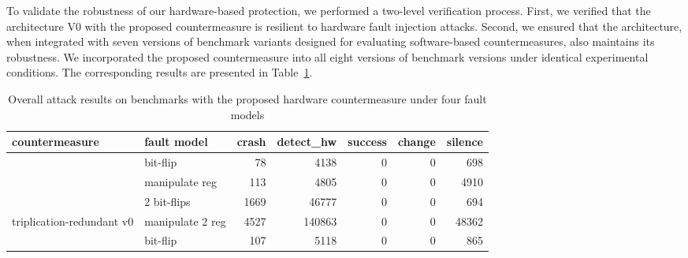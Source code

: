 To validate the robustness of our hardware-based protection, we performed a two-level verification process. First, we verified that the architecture V0 with the proposed countermeasure is resilient to hardware fault injection attacks. Second, we ensured that the architecture, when integrated with seven versions of benchmark variants designed for evaluating software-based countermeasures, also maintains its robustness. We incorporated the proposed countermeasure into all eight versions of benchmark versions under identical experimental conditions. The corresponding results are presented in Table~\ref{tab:our cm}.

\begin{table}
  \centering
  \caption{Overall attack results on benchmarks with the proposed hardware countermeasure under four fault models}
  \label{tab:our cm}
\begin{tabular}{llrrrrr}
\hline
countermeasure                                                        & fault model      & \multicolumn{1}{c}{crash} & \multicolumn{1}{c}{detect\_hw} & \multicolumn{1}{c}{success} & \multicolumn{1}{c}{change} & \multicolumn{1}{c}{silence} \\
\hline
                                              & bit-flip          & 78                                                & 4138                                                   & 0 & 0                                                   & 698                                                 \\
                                              & manipulate reg   & 113                                               & 4805                                                   & 0 & 0                                                   & 4910                                                \\
                                              & 2 bit-flips        & 1669                                              & 46777                                                  & 0 & 0                                                  & 694                                                 \\
\multirow{-4}{*}{triplication-redundant v0} & manipulate 2 reg & 4527                                              & 140863                                                 & 0 & 0                                                  & 48362                                               \\
\hline
                                              & bit-flip          & 107                                               & 5118                                                   & 0 & 0                                                  & 865                                                 \\

\end{tabular}
\end{table}

